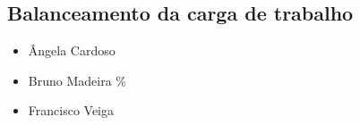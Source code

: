 
\subsection{Balanceamento da carga de trabalho}
\begin{itemize}
\item \^Angela Cardoso    %
\item Bruno Madeira \%  %
\item Francisco Veiga				
\end{itemize}